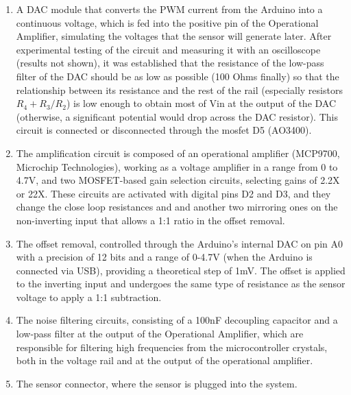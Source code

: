\documentclass[conference]{IEEEtran}
\begin{document}
         \begin{enumerate}
            \item A DAC module that converts the PWM current from the Arduino into a continuous voltage, which is fed into the positive 
               pin of the Operational Amplifier, simulating the voltages that the sensor will generate later. After experimental testing of
               the circuit and measuring it with an oscilloscope (results not shown), it was established that the resistance of the low-pass
               filter of the DAC should be as low as possible (100 Ohms finally) so that the relationship between its resistance and the
               rest of the rail (especially resistors $R_4 + {R_3} / {R_2}$) is low enough to obtain most of Vin at the output of the
               DAC (otherwise, a significant potential would drop across the DAC resistor). This circuit is connected or disconnected
               through the mosfet D5 (AO3400).

            \item The amplification circuit is composed of an operational amplifier (MCP9700, Microchip Technologies), working as a voltage amplifier in a range from 0 to 4.7V, and two MOSFET-based
               gain selection circuits, selecting gains of 2.2X or 22X. These circuits are activated with digital pins D2 and D3, and they change the close loop resistances
               and and another two mirroring ones on the non-inverting input that allows a 1:1 ratio in the offset removal.

            \item The offset removal, controlled through the Arduino's internal DAC on pin A0 with a precision of 12 bits and a range of 0-4.7V
               (when the Arduino is connected via USB), providing a theoretical step of 1mV. The offset is applied to the inverting input and undergoes
               the same type of resistance as the sensor voltage to apply a 1:1 subtraction.

            \item The noise filtering circuits, consisting of a 100nF decoupling capacitor and a low-pass filter at the output of the Operational
               Amplifier, which are responsible for filtering high frequencies from the microcontroller crystals, both in the voltage rail and at
               the output of the operational amplifier.

            \item The sensor connector, where the sensor is plugged into the system.
         \end{enumerate}
\end{document}
